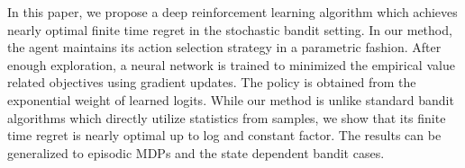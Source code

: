 In this paper, we propose a deep reinforcement learning algorithm which achieves nearly optimal finite time regret in the stochastic bandit setting. In our method, the agent maintains its action selection strategy in a parametric fashion. After enough exploration, a neural network is trained to minimized the empirical value related objectives using gradient updates. The policy is obtained from the exponential weight of learned logits. While our method is unlike standard bandit algorithms which directly utilize statistics from samples, we show that its finite time regret is nearly optimal up to log and constant factor. The results can be generalized to episodic MDPs and the state dependent bandit cases.